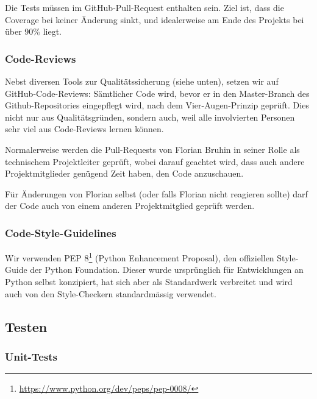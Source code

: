 \documentclass[a4paper]{article}
\begin{document}
Die Tests müssen im GitHub-Pull-Request enthalten sein. Ziel ist, dass die
Coverage bei keiner Änderung sinkt, und idealerweise am Ende des Projekts bei
über 90\% liegt.

\subsubsection{Code-Reviews}
\label{sec:codereviews}

Nebst diversen Tools zur Qualitätssicherung (siehe unten), setzen wir auf GitHub-Code-Reviews: Sämtlicher Code wird, bevor er in den Master-Branch des
Github-Repositories eingepflegt wird, nach dem Vier-Augen-Prinzip geprüft. Dies
nicht nur aus Qualitätsgründen, sondern auch, weil alle involvierten Personen
sehr viel aus Code-Reviews lernen können.

Normalerweise werden die Pull-Requests von Florian Bruhin in seiner Rolle als
technischem Projektleiter geprüft, wobei darauf geachtet wird, dass auch andere
Projektmitglieder genügend Zeit haben, den Code anzuschauen.

Für Änderungen von Florian selbst (oder falls Florian nicht reagieren sollte)
darf der Code auch von einem anderen Projektmitglied geprüft werden.

\subsubsection{Code-Style-Guidelines}
Wir verwenden PEP 8\footnote{\url{https://www.python.org/dev/peps/pep-0008/}}
(Python Enhancement Proposal), den offiziellen Style-Guide der Python
Foundation. Dieser wurde ursprünglich für Entwicklungen an Python selbst
konzipiert, hat sich aber als Standardwerk verbreitet und wird auch von den
Style-Checkern standardmässig verwendet.

\subsection{Testen}

\subsubsection{Unit-Tests}
\end{document}
